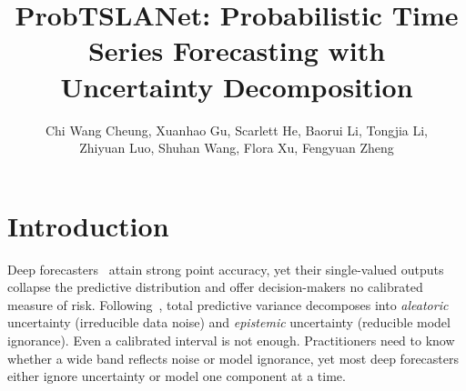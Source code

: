 \documentclass{llncs}
\begin{document}
\title{ProbTSLANet: Probabilistic Time Series Forecasting with Uncertainty Decomposition}

\author{Chi Wang Cheung, Xuanhao Gu, Scarlett He, Baorui Li, Tongjia Li, \\ Zhiyuan Luo, Shuhan Wang, Flora Xu, Fengyuan Zheng}


\maketitle


\section{Introduction}
\label{sec:intro}

Deep forecasters~\cite{zhou2021informer,nie2023patchtst,eldele2024tslanet} attain strong point accuracy, yet their single-valued outputs collapse the predictive distribution and offer decision-makers no calibrated measure of risk. Following~\cite{kendall2017uncertainties,hullermeier2021aleatoric}, total predictive variance decomposes into \emph{aleatoric} uncertainty (irreducible data noise) and \emph{epistemic} uncertainty (reducible model ignorance). Even a calibrated interval is not enough. Practitioners need to know whether a wide band reflects noise or model ignorance, yet most deep forecasters either ignore uncertainty or model one component at a time.
\end{document}
